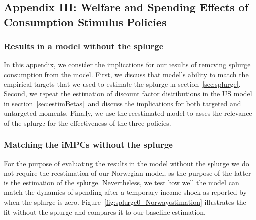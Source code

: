 
\chapter{}
\section{Appendix III: Welfare and Spending Effects of Consumption Stimulus Policies }
\label{append:three}


\hypertarget{Model_without_splurge}{}\par\subsection{Results in a model without the splurge}
\label{app:Model_without_splurge}

In this appendix, we consider the implications for our results of removing splurge consumption from the model.
First, we discuss that model's ability to match the empirical targets that we used to estimate the splurge in section~\ref{sec:splurge}.
Second, we repeat the estimation of discount factor distributions in the US model in section~\ref{sec:estimBetas}, and discuss the implications for both targeted and untargeted moments.
Finally, we use the reestimated model to asses the relevance of the splurge for the effectiveness of the three policies.


\subsection{Matching the iMPCs without the splurge}

For the purpose of evaluating the results in the model without the splurge we do not require the reestimation of our Norwegian model, as the purpose of the latter is the estimation of the splurge.
Nevertheless, we test how well the model can match the dynamics of spending after a temporary income shock as reported by \citet{fagereng_mpc_2021} when the splurge is zero.
Figure~\ref{fig:splurge0_Norwayestimation} illustrates the fit without the splurge and compares it to our baseline estimation.


